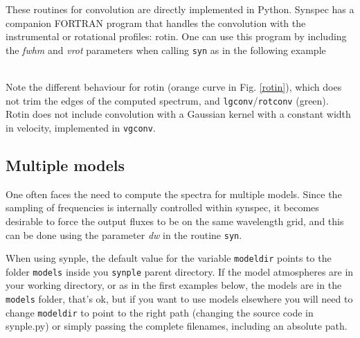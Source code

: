 \documentclass[]{article}
\begin{document}
These routines for convolution are directly implemented in Python. Synspec has a companion FORTRAN program that handles the convolution with the instrumental or rotational profiles: rotin. One can use this program by including the {\it fwhm} and {\it vrot} parameters when calling {\tt syn} as in the following example

\\
\noindent Note the different behaviour for rotin (orange curve in Fig. \ref{rotin}), which does not trim the edges of the computed spectrum, and {\tt lgconv}/{\tt rotconv} (green). Rotin does not include convolution with a Gaussian kernel with a constant width in velocity, implemented in {\tt vgconv}. 

\subsection{Multiple models}

One often faces the need to compute the spectra for multiple models. Since the sampling of frequencies is internally controlled within synspec, it becomes desirable to force the output fluxes to be on the same wavelength grid, and this can be done using the parameter {\it dw} in the routine {\tt syn}.

When using synple, the default value for the variable {\tt modeldir} points to the folder {\tt models} inside you {\tt synple} parent directory. If the model atmospheres are in your working directory, or as in the first examples below, the models are in the  {\tt models} folder, that's ok, but if you want to use models elsewhere you will need to change {\tt modeldir} to point to the right path (changing the source code in synple.py) or simply passing the complete filenames, including an absolute path.
\end{document}
